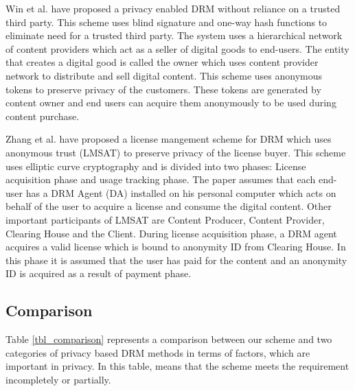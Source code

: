\documentclass[times]{secauth}
\begin{document}
Win et al. \cite{PRIVENDRM} have proposed a privacy enabled DRM without reliance on a trusted third party. This scheme uses blind signature and one-way hash functions to eliminate need for a trusted third party. The system uses a hierarchical network of content providers which act as a seller of digital goods to end-users. The entity that creates a digital good is called the owner which uses content provider network to distribute and sell digital content. This scheme uses anonymous tokens to preserve privacy of the customers. These tokens are generated by content owner and end users can acquire them anonymously to be used during content purchase. 

Zhang et al. \cite{LMSAT} have proposed a license mangement scheme for DRM which uses anonymous trust (LMSAT) to preserve privacy of the license buyer. This scheme uses elliptic curve cryptography and is divided into two phases: License acquisition phase and usage tracking phase. The paper assumes that each end-user has a DRM Agent (DA) installed on his personal computer which acts on behalf of the user to acquire a license and consume the digital content. Other important participants of LMSAT are Content Producer, Content Provider, Clearing House and the Client. During license acquisition phase, a DRM agent acquires a valid license which is bound to anonymity ID from Clearing House. In this phase it is assumed that the user has paid for the content and an anonymity ID is acquired as a result of payment phase.

\subsection{Comparison}
Table \ref{tbl_comparison} represents a comparison between our scheme and two categories of privacy based DRM methods in terms of factors, which are important in privacy. In this table,  means that the scheme meets the requirement incompletely or partially.
\end{document}
